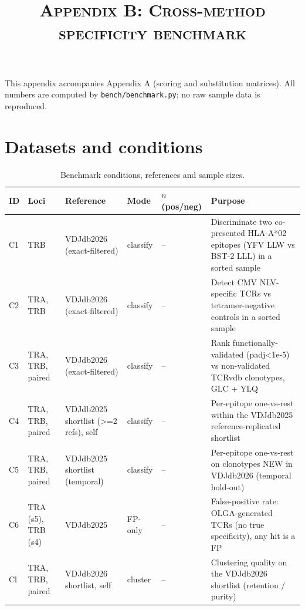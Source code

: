 \documentclass[11pt]{article}
\title{\scshape Appendix B: Cross-method specificity benchmark}\author{}\date{}
\begin{document}
\maketitle
\noindent This appendix accompanies Appendix A (scoring and substitution matrices). All numbers are computed by \texttt{bench/benchmark.py}; no raw sample data is reproduced.

\section{Datasets and conditions}

\begin{table}[htbp]\centering
\caption{Benchmark conditions, references and sample sizes.}\label{tab:conditions}
\footnotesize
\begin{tabular}{llp{2.6cm}lp{2.4cm}p{4.2cm}}\toprule
ID & Loci & Reference & Mode & $n$ (pos/neg) & Purpose \\\midrule
C1 & TRB & VDJdb2026 (exact-filtered) & classify & -- & Discriminate two co-presented HLA-A*02 epitopes (YFV LLW vs BST-2 LLL) in a sorted sample \\
C2 & TRA, TRB & VDJdb2026 (exact-filtered) & classify & -- & Detect CMV NLV-specific TCRs vs tetramer-negative controls in a sorted sample \\
C3 & TRA, TRB, paired & VDJdb2026 (exact-filtered) & classify & -- & Rank functionally-validated (padj<1e-5) vs non-validated TCRvdb clonotypes, GLC + YLQ \\
C4 & TRA, TRB, paired & VDJdb2025 shortlist (>=2 refs), self & classify & -- & Per-epitope one-vs-rest within the VDJdb2025 reference-replicated shortlist \\
C5 & TRA, TRB, paired & VDJdb2025 shortlist (temporal) & classify & -- & Per-epitope one-vs-rest on clonotypes NEW in VDJdb2026 (temporal hold-out) \\
C6 & TRA (s5), TRB (s4) & VDJdb2025 & FP-only & -- & False-positive rate: OLGA-generated TCRs (no true specificity), any hit is a FP \\
Cl & TRA, TRB, paired & VDJdb2026 shortlist, self & cluster & -- & Clustering quality on the VDJdb2026 shortlist (retention / purity) \\
\bottomrule\end{tabular}
\end{table}
\end{document}
